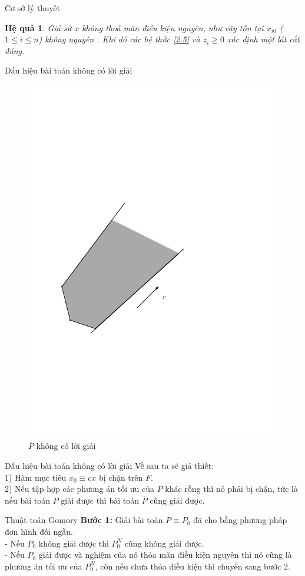 \documentclass[10pt]{beamer}
\newtheorem{hq}{Hệ quả}[section]
\begin{document}
    \begin{frame}{Cơ sở lý thuyết}
        \begin{hq}
        Giả sử $x$ không thoả mãn điều kiện nguyên, như vậy tồn tại  $x_{i0}$ ($1\le i\le n$)  không nguyên . Khi đó các hệ thức \eqref{2.5}  và $z_i \ge 0$ xác định một lát cắt đúng.
    \end{hq} 
    \end{frame}

    \begin{frame}{Dấu hiệu bài toán không có lời giải}
        \begin{figure}[h]
\centering
\includegraphics[width=0.4\linewidth]{anh3.pdf}
\caption{$\overline{P}$ không có lời giải}
\end{figure}
    \end{frame}

    \begin{frame}{Dấu hiệu bài toán không có lời giải}
        Về sau ta sẽ giả thiết:\\
1) Hàm mục tiêu $x_0\equiv cx$ bị chặn trên $F$.\\
2) Nếu tập hợp các phương án tối ưu của $P$ khác rỗng thì nó phải bị chặn, tức là nếu bài toán $P$ giải được thì bài toán $\overline{P}$ cũng giải 
được.\\
    \end{frame}

    \begin{frame}{Thuật toán Gomory}
        \textbf{Bước 1:}
Giải bài toán $P\equiv P_0$ đã cho bằng phương pháp đơn hình đối ngẫu.\\
- Nếu $P_0$ không giải được thì $P_0^N$ cũng không giải được.\\
- Nếu  $P_0$ giải được và nghiệm của nó thỏa mãn điều kiện nguyên thì nó cũng là phương án tối ưu của $P^N_0$, còn nếu chưa thỏa điều kiện thì chuyển sang bước 2.\\
       
    \end{frame}
\end{document}
